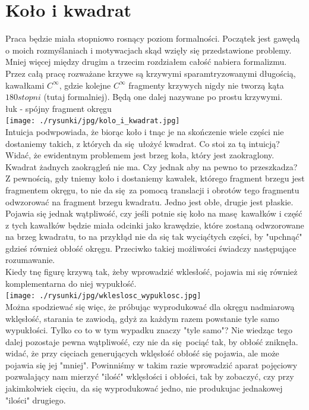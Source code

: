 \documentclass[a4paper, 12pt]{article}
\newcommand{\rysunek}[1]{\hfill \break\\[16pt] \Huge \textbf{\textcolor{violet}{Brakujący rysunek \normalsize
#1}} \hfill
\break \\[16pt] \normalsize}
\begin{document}
 \section{Koło i kwadrat}
Praca będzie miała stopniowo rosnący poziom formalności. Początek jest gawędą o moich rozmyślaniach i
motywacjach skąd wzięły się przedstawione problemy. Mniej więcej między drugim a trzecim rozdziałem
całość nabiera formalizmu. Przez całą pracę rozważane krzywe są krzywymi sparamtryzowanymi długością,
 kawałkami $C^\infty$, gdzie kolejne $C^\infty$ fragmenty krzywych nigdy nie tworzą kąta $180 stopni$
 (tutaj formalniej). Będą one dalej nazywane po prostu krzywymi. \\
łuk - spójny fragment okręgu \\[16pt]
\texttt{[image: ./rysunki/jpg/kolo\_i\_kwadrat.jpg]} \\
Intuicja podwpowiada, że biorąc koło i tnąc je na skończenie wiele części nie dostaniemy takich, z których
da się ułożyć kwadrat. Co stoi za tą intuicją? Widać, że ewidentnym problemem jest brzeg koła, który jest
zaokraglony. Kwadrat żadnych zaokrągleń nie ma. Czy jednak aby na pewno to przeszkadza? Z pewnością, gdy
tniemy koło i dostaniemy kawałek, którego fragment brzegu jest fragmentem okręgu, to nie da się za pomocą
translacji i obrotów tego fragmentu odwzorować na fragment brzegu kwadratu. Jedno jest obłe, drugie jest
płaskie. Pojawia się jednak wątpliwość, czy jeśli potnie się koło na masę kawałków i część z tych kawałków
będzie miała odcinki jako krawędzie, które zostaną odwzorowane na brzeg kwadratu, to na przykłąd nie da się
tak wyciąćtych części, by "upchnąć" gdzieś również obłość okręgu. Przeciwko takiej możliwości świadczy
następujące rozumawanie. \\
Kiedy tnę figurę krzywą tak, żeby wprowadzić wklesłość, pojawia mi się również komplementarna do niej
wypukłość. \\
\texttt{[image: ./rysunki/jpg/wkleslosc\_wypuklosc.jpg]} \\
Można spodziewać się więc, że próbując wyprodukować dla okręgu nadmiarową wklęsłość, starania te zawiodą,
gdyż za każdym razem powstanie tyle samo wypukłości. Tylko co to w tym wypadku znaczy "tyle samo"?
Nie wiedząc tego dalej pozostaje pewna wątpliwość, czy nie da się pociąć tak, by obłość zniknęła. widać, że
przy cięciach generujących wklęsłość obłość się pojawia, ale może pojawia się jej "mniej". Powinniśmy w takim
razie wprowadzić aparat pojęciowy pozwalający nam mierzyć "ilość" wklęsłości i obłości, tak by zobaczyć, czy
przy jakimkolwiek cięciu, da się wyprodukować jedno, nie produkujac jednakowej "ilości" drugiego. \\[4pt]
\end{document}
